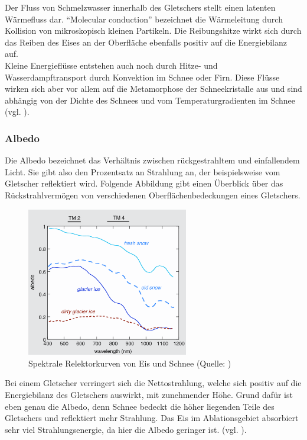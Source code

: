 \documentclass[11pt,a4paper]{article}
\begin{document}
Der Fluss von Schmelzwasser innerhalb des Gletschers stellt einen latenten Wärmefluss dar. 
``Molecular conduction'' bezeichnet die Wärmeleitung durch Kollision von mikroskopisch kleinen Partikeln. Die Reibungshitze wirkt sich durch das Reiben des Eises an der Oberfläche ebenfalls positiv auf die Energiebilanz auf.\\
Kleine Energieflüsse entstehen auch noch durch Hitze- und Wasserdampftransport durch Konvektion im Schnee oder Firn. Diese Flüsse wirken sich aber vor allem auf die Metamorphose der Schneekristalle aus und sind abhängig von der Dichte des Schnees und vom Temperaturgradienten im Schnee (vgl. \cite[17]{Themicroclimateofvalleyglaciers}).


\subsubsection{Albedo}\label{Albedo}
Die Albedo bezeichnet das Verhältnis zwischen rückgestrahltem und einfallendem Licht. Sie gibt also den Prozentsatz an Strahlung an, der beispielsweise vom Gletscher reflektiert wird. Folgende Abbildung gibt einen Überblick über das Rückstrahlvermögen von verschiedenen Oberflächenbedeckungen eines Gletschers.

\begin{figure}[H]
\centering
\includegraphics[width=0.63\textwidth]{pictures/spectral_reflectance_curves_for_ice_and_snow.png}
\caption[Spektrale Relektorkurven von Eis und Schnee]{Spektrale Relektorkurven von Eis und Schnee (Quelle: \cite{Themicroclimateofvalleyglaciers})}
\label{fig:Spektrale Relektorkurven von Eis und Schnee}
\end{figure}

Bei einem Gletscher verringert sich die Nettostrahlung, welche sich positiv auf die Energiebilanz des Gletschers auswirkt, mit zunehmender Höhe. Grund dafür ist eben genau die Albedo, denn Schnee bedeckt die höher liegenden Teile des Gletschers und reflektiert mehr Strahlung. Das Eis im Ablationsgebiet absorbiert sehr viel Strahlungsenergie, da hier die Albedo geringer ist. (vgl. \cite[171]{ThePhysicsOfGlaciers}).
\end{document}
